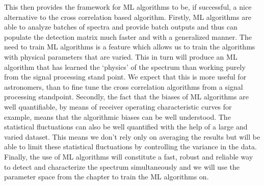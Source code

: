 This then provides the framework for ML algorithms to be, if successful, a nice alternative to the cross correlation based algorithm.
Firstly, ML algorithms are able to analyze batches of spectra and provide batch outputs and thus can populate the detection matrix much faster and with a generalized manner.
The need to train ML algorithms is a feature which allows us to train the algorithms with physical parameters that are varied.
This in turn will produce an ML algorithm that has learned the `physics' of the spectrum than working purely from the signal processing stand point.
We expect that this is more useful for astronomers, than to fine tune the cross correlation algorithms from a signal processing standpoint.
Secondly, the fact that the biases of ML algorithms are well quantifiable, by means of receiver operating characteristic curves for example, means that the algorithmic biases can be well understood. 
The statistical fluctuations can also be well quantified  with the help of a large and varied dataset.
This means we don't rely only on averaging the results but will be able to limit these statistical fluctuations by controlling the variance in the data.
Finally, the use of ML algorithms will constitute a fast, robust and reliable way to detect and characterize the spectrum simultaneously and we will use the parameter space from the chapter to train the ML algorithms on.